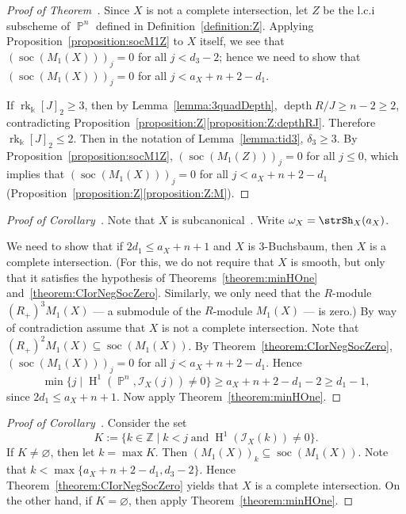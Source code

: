 \documentclass[11pt,a4paper]{amsart}
\theoremstyle{plain}
\theoremstyle{definition}
\newcommand{\calI}{\mathcal I}
\newcommand{\ints}{\mathbb{Z}}
\DeclareMathOperator{\rank}{rk}
\DeclareMathOperator{\projective}{\mathbb{P}}
\DeclareMathOperator{\depth}{depth}
\DeclareMathOperator{\homology}{H}
\DeclareMathOperator{\socle}{soc}
\begin{document}
\begin{proof}[Proof of Theorem~\protect{\ref{theorem:CIorNegSocZero}}]
%
Since $X$ is not a complete intersection,
let $Z$ be the l.c.i subscheme of $\projective^n$ defined in
Definition~\ref{definition:Z}.
Applying Proposition~\ref{proposition:socM1Z} to $X$ itself, we see that 
$(\socle(M_1(X)))_j = 0$ for all $j < d_3-2$; hence we need to show that 
$(\socle(M_1(X)))_j = 0$ for all $j < a_X+n+2-d_1$.

If $\rank_\Bbbk [J]_2 \geq 3$, then
by Lemma~\ref{lemma:3quadDepth}, $\depth R/J \geq n-2 \geq 2$, 
contradicting Proposition~\ref{proposition:Z}\eqref{proposition:Z:depthRJ}.
Therefore $\rank_\Bbbk [J]_2 \leq 2$.
Then in the notation of 
Lemma~\ref{lemma:tid3}, $\delta_3 \geq 3$.
By Proposition~\ref{proposition:socM1Z},
$(\socle(M_1(Z)))_j = 0$ for all $j \leq 0$, which implies that 
$(\socle(M_1(X)))_j = 0$ for all $j < a_X+n+2-d_1$
(Proposition~\ref{proposition:Z}\eqref{proposition:Z:M}).
\end{proof}

\begin{proof}[Proof of Corollary~\protect{\ref{corollary:3Buchs}}]
Note that $X$ is
subcanonical~\cite[Theorem~2.2(d)]{HartshorneVarSmallCodim1974}.
Write $\omega_X = \strSh_X(a_X )$.

We need to show that if
$2d_1 \leq a_X + n+1$ and $X$ is $3$-Buchsbaum, then $X$ is a complete
intersection. (For this, we do not require that $X$ is smooth, but only
that it satisfies the hypothesis of Theorems~\ref{theorem:minHOne}
and~\ref{theorem:CIorNegSocZero}. Similarly, we only need that 
the $R$-module $(R_+)^3 M_1(X)$ 
--- a submodule of the $R$-module $M_1(X)$ ---
is zero.)
By way of contradiction assume that $X$ is not a complete intersection.
Note that $(R_+)^2 M_1(X) \subseteq \socle(M_1(X))$.
By Theorem~\ref{theorem:CIorNegSocZero}, 
$(\socle(M_1(X)))_j = 0$ for all $j < a_X+n+2-d_1$.
Hence
\[
\min\{j \mid \homology^1(\projective^n, \calI_X(j)) \neq 0 \}
\geq a_X+n+2-d_1-2 \geq d_1-1,
\]
since $2d_1 \leq a_X+n+1$. Now apply Theorem~\ref{theorem:minHOne}.
\end{proof}

\begin{proof}[Proof of Corollary~\protect{\ref{corollary:gap}}]
Consider the set 
\[
K := \{k \in \ints \mid k < j \;\text{and}\; 
\homology^1(\calI_X(k)) \neq 0\}.
\]
If $K \neq \varnothing$, then let $k = \max K$. Then 
$(M_1(X))_k \subseteq \socle(M_1(X))$. 
Note that $k < \max \{ a_X+n+2-d_1, d_3-2\}$.
Hence Theorem~\ref{theorem:CIorNegSocZero} yields that $X$ is a complete
intersection.
On the other hand, if $K = \varnothing$, then apply
Theorem~\ref{theorem:minHOne}.
\end{proof}
\end{document}
